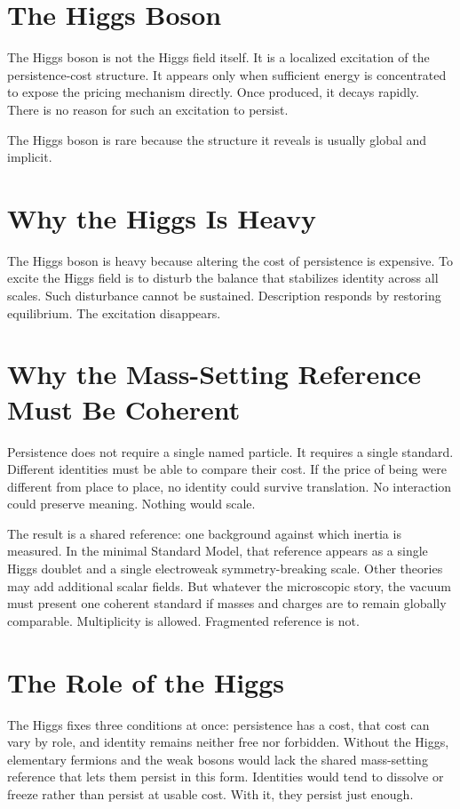 \documentclass[11pt,twoside,openright]{book}
\begin{document}
\section*{The Higgs Boson}

The Higgs boson is not the Higgs field itself. It is a localized excitation of the persistence-cost structure. It appears only when sufficient energy is concentrated to expose the pricing mechanism directly. Once produced, it decays rapidly. There is no reason for such an excitation to persist.

The Higgs boson is rare because the structure it reveals is usually global and implicit.

\section*{Why the Higgs Is Heavy}

The Higgs boson is heavy because altering the cost of persistence is expensive. To excite the Higgs field is to disturb the balance that stabilizes identity across all scales. Such disturbance cannot be sustained. Description responds by restoring equilibrium. The excitation disappears.

\section*{Why the Mass-Setting Reference Must Be Coherent}

Persistence does not require a single named particle. It requires a single standard. Different identities must be able to compare their cost. If the price of being were different from place to place, no identity could survive translation. No interaction could preserve meaning. Nothing would scale.

The result is a shared reference: one background against which inertia is measured. In the minimal Standard Model, that reference appears as a single Higgs doublet and a single electroweak symmetry-breaking scale. Other theories may add additional scalar fields. But whatever the microscopic story, the vacuum must present one coherent standard if masses and charges are to remain globally comparable. Multiplicity is allowed. Fragmented reference is not.

\section*{The Role of the Higgs}

The Higgs fixes three conditions at once: persistence has a cost, that cost can vary by role, and identity remains neither free nor forbidden. Without the Higgs, elementary fermions and the weak bosons would lack the shared mass-setting reference that lets them persist in this form. Identities would tend to dissolve or freeze rather than persist at usable cost. With it, they persist just enough.
\end{document}
